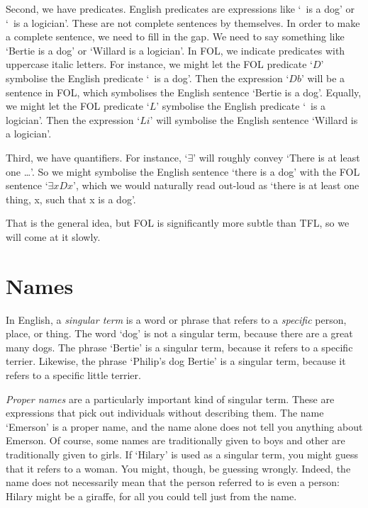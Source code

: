 Second, we have predicates. English predicates are expressions like `\blank\ is a dog' or `\blank\ is a logician'. These are not complete sentences by themselves. In order to make a complete sentence, we need to fill in the gap. We need to say something like `Bertie is a dog' or `Willard is a logician'. In FOL, we indicate predicates with uppercase italic letters. For instance, we might let the FOL predicate `$D$' symbolise the English predicate `\blank\ is a dog'. Then the expression `$Db$' will be a sentence in FOL, which symbolises the English sentence `Bertie is a dog'. Equally, we might let the FOL predicate `$L$' symbolise the English predicate `\blank\ is a logician'. Then the expression `$Li$' will symbolise the English sentence `Willard is a logician'.

Third, we have quantifiers. For instance, `$\exists$' will roughly convey `There is at least one \ldots'. So we might symbolise the English sentence `there is a dog' with the FOL sentence `$\exists x Dx$', which we would naturally read out-loud as `there is at least one thing, x, such that x is a dog'.

That is the general idea, but FOL is significantly more subtle than TFL, so we will come at it slowly. 


\section{Names}
In English, a \emph{singular term} is a word or phrase that refers to a \emph{specific} person, place, or thing. The word `dog' is not a singular term, because there are a great many dogs. The phrase `Bertie' is a singular term, because it refers to a specific terrier. Likewise, the phrase `Philip's dog Bertie' is a singular term, because it refers to a specific little terrier. 

\emph{Proper names} are a particularly important kind of singular term. These are expressions that pick out individuals without describing them. The name `Emerson' is a proper name, and the name alone does not tell you anything about Emerson. Of course, some names are traditionally given to boys and other are traditionally given to girls. If `Hilary' is used as a singular term, you might guess that it refers to a woman. You might, though, be guessing wrongly. Indeed, the name does not necessarily mean that the person referred to is even a person: Hilary might be a giraffe, for all you could tell just from the name. 

